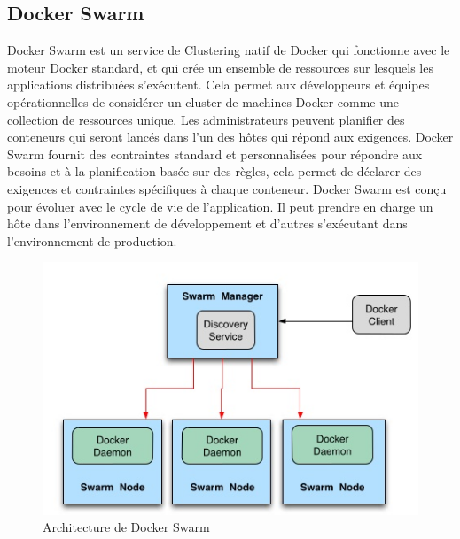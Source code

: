 \begin{onehalfspace}
\subsection*{Docker Swarm}
 Docker Swarm est un service de Clustering natif de Docker qui fonctionne avec le moteur Docker standard, et qui crée un ensemble de ressources sur lesquels les applications distribuées s'exécutent. Cela permet aux développeurs et équipes opérationnelles de considérer un cluster de machines Docker comme une collection de ressources unique. Les administrateurs peuvent planifier des conteneurs qui seront lancés dans l'un des hôtes qui répond aux exigences. Docker Swarm fournit des contraintes standard et personnalisées pour répondre aux besoins et à la planification basée sur des règles, cela permet de déclarer des exigences et contraintes spécifiques à chaque conteneur. Docker Swarm est conçu pour évoluer avec le cycle de vie de l'application. Il peut prendre en charge un hôte dans l'environnement de développement et d'autres s'exécutant dans l'environnement de production.
\begin{figure}[H]
\centering
\includegraphics [scale=0.6]{chapitre3/assets/dockerswarm.png}
\caption{Architecture de Docker Swarm}
\end{figure}

\end{onehalfspace}

